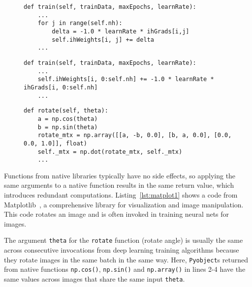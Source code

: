 \begin{figure}[t]
\begin{lstlisting}[caption={Interaction inefficiencies in IrisData due to the iteration on Numpy arrays within a loop.},label=lst:iris1]
def train(self, trainData, maxEpochs, learnRate):
    ...
    for j in range(self.nh):
        delta = -1.0 * learnRate * ihGrads[i,j]
        self.ihWeights[i, j] += delta
    ...
\end{lstlisting}
\end{figure}



\begin{figure}[t]
\begin{lstlisting}[caption={Optimized IrisData code with slice notation.},label=lst:iris2]
def train(self, trainData, maxEpochs, learnRate):
    ...
    self.ihWeights[i, 0:self.nh] += -1.0 * learnRate * ihGrads[i, 0:self.nh]
    ...
\end{lstlisting}
\end{figure}



\begin{figure}[t]
\begin{lstlisting}[caption={Interaction inefficiencies in Matplotlib due to the same input {\tt theta}.},label=lst:matplot1]
def rotate(self, theta):
    a = np.cos(theta)
    b = np.sin(theta)
    rotate_mtx = np.array([[a, -b, 0.0], [b, a, 0.0], [0.0, 0.0, 1.0]], float)
    self._mtx = np.dot(rotate_mtx, self._mtx)
    ...
\end{lstlisting}
\end{figure}


Functions from native libraries typically have no side effects, so applying the same arguments to a native function results in the same return value, which introduces redundant computations. 
Listing~\ref{lst:matplot1} shows a code from Matplotlib~\cite{Hunter:2007}, a comprehensive library for visualization and image manipulation. This code rotates an image and is often invoked in training neural nets for images. 

The argument {\tt theta} for the {\tt rotate} function (rotate angle) is usually the same across consecutive invocations from deep learning training algorithms because they rotate images in the same batch in the same way. Here, {\tt Pyobject}s returned from native functions {\tt np.cos()}, {\tt np.sin()} and {\tt np.array()} in lines 2-4 have the same values across images that share the same input {\tt theta}. 

